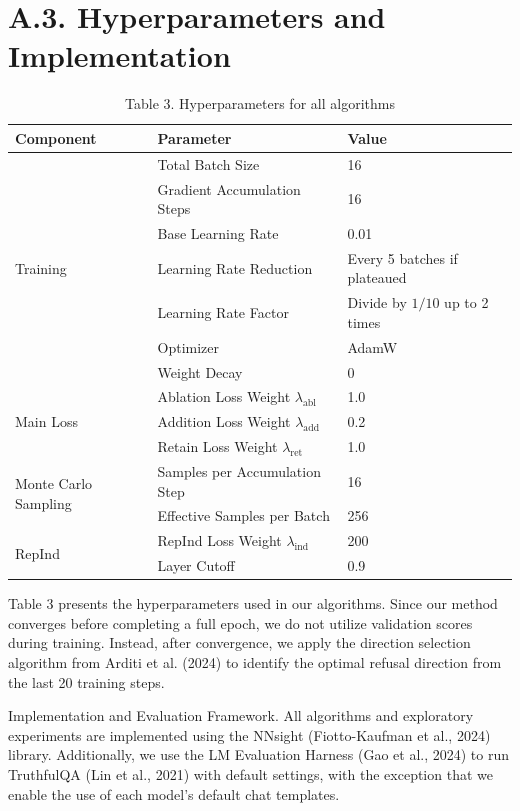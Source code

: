 \documentclass[10pt]{article}
\begin{document}
\section*{A.3. Hyperparameters and Implementation}
\begin{table}[h]
\begin{center}
\captionsetup{labelformat=empty}
\caption{Table 3. Hyperparameters for all algorithms}
\begin{tabular}{|l|l|l|}
\hline
Component & Parameter & Value \\
\hline
\multirow[t]{7}{*}{Training} & Total Batch Size & 16 \\
\hline
 & Gradient Accumulation Steps & 16 \\
\hline
 & Base Learning Rate & 0.01 \\
\hline
 & Learning Rate Reduction & Every 5 batches if plateaued \\
\hline
 & Learning Rate Factor & Divide by $1 / 10$ up to 2 times \\
\hline
 & Optimizer & AdamW \\
\hline
 & Weight Decay & 0 \\
\hline
\multirow[t]{3}{*}{Main Loss} & Ablation Loss Weight $\lambda_{\text {abl }}$ & 1.0 \\
\hline
 & Addition Loss Weight $\lambda_{\text {add }}$ & 0.2 \\
\hline
 & Retain Loss Weight $\lambda_{\text {ret }}$ & 1.0 \\
\hline
\multirow[t]{2}{*}{Monte Carlo Sampling} & Samples per Accumulation Step & 16 \\
\hline
 & Effective Samples per Batch & 256 \\
\hline
\multirow[t]{2}{*}{RepInd} & RepInd Loss Weight $\lambda_{\text {ind }}$ & 200 \\
\hline
 & Layer Cutoff & 0.9 \\
\hline
\end{tabular}
\end{center}
\end{table}

Table 3 presents the hyperparameters used in our algorithms. Since our method converges before completing a full epoch, we do not utilize validation scores during training. Instead, after convergence, we apply the direction selection algorithm from Arditi et al. (2024) to identify the optimal refusal direction from the last 20 training steps.

Implementation and Evaluation Framework. All algorithms and exploratory experiments are implemented using the NNsight (Fiotto-Kaufman et al., 2024) library. Additionally, we use the LM Evaluation Harness (Gao et al., 2024) to run TruthfulQA (Lin et al., 2021) with default settings, with the exception that we enable the use of each model's default chat templates.
\end{document}
